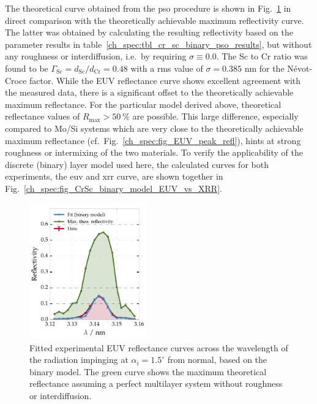 The theoretical curve obtained from the \gls{pso} procedure is shown in Fig.~\ref{ch_spec:fig_CrSc_binary_fit_vs_max_refl} in direct comparison with the theoretically achievable maximum reflectivity curve. The latter was obtained by calculating the resulting reflectivity based on the parameter results in table~\ref{ch_spec:tbl_cr_sc_binary_pso_results}, but without any roughness or interdiffusion, i.e.~by requiring $\sigma \equiv 0.0$. The Sc 
to Cr ratio was found to be $\Gamma_\text{Sc}= d_\text{Sc}/d_\text{Cr} = 0.48$ with a \gls{rms} value of $\sigma=0.385$ nm for the N\'{e}vot-Croce factor. While the EUV reflectance curve shows excellent agreement with the measured data, there is a significant offset to the theoretically achievable maximum reflectance. For the particular model derived above, theoretical reflectance values of $R_\text{max} > \SI{50}{\percent}$ are possible. This large difference, especially compared to Mo/Si systems which are very close to the theoretically achievable maximum reflectance (cf.~Fig.~\ref{ch_spec:fig_EUV_peak_refl}), hints at strong roughness or intermixing of the two materials. To verify the applicability of the discrete (binary) layer model used here, the calculated curves for both experiments, the \gls{euv} and \gls{xrr} curve, are shown together in Fig.~\ref{ch_spec:fig_CrSc_binary_model_EUV_vs_XRR}.
\begin{figure}[htbp]
  \centering
  \includegraphics[width=0.45\textwidth]{img/CrSc_binary_fit_vs_max_refl}
  \caption[Fitted experimental EUV reflectance curves for the Cr/Sc sample.]{Fitted experimental EUV reflectance curves across the wavelength 
of the radiation impinging at $\alpha_i=1.5^\circ$ from normal, based on the binary 
model. The green curve shows the maximum theoretical reflectance assuming a perfect multilayer system without roughness or interdiffusion.}
  \label{ch_spec:fig_CrSc_binary_fit_vs_max_refl}
\end{figure}
